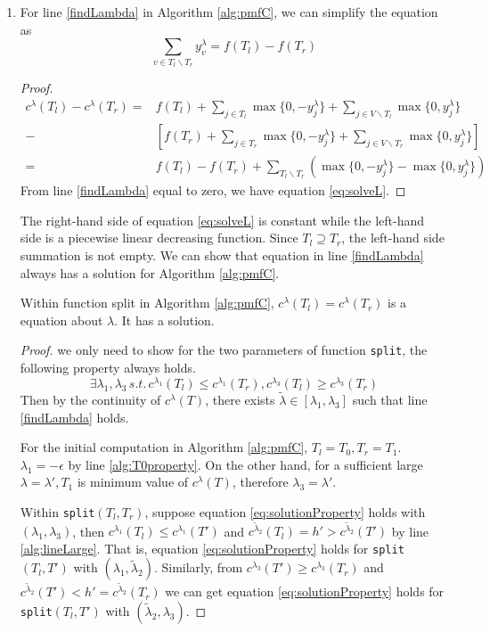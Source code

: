 \documentclass{article}
\begin{document}
\begin{enumerate}
\item For line \ref{findLambda} in  Algorithm \ref{alg:pmfC}, we can simplify the equation as
\begin{equation}\label{eq:solveL}
	\sum_{v\in T_l \backslash T_r} y^{\lambda}_v  = f(T_l)-f(T_r)
\end{equation}
\begin{proof}
	\begin{align*}
	c^{\lambda}(T_l) -
	c^{\lambda}(T_r)  =& f(T_l) + \sum_{j \in T_l} \max\{0, -y^{\lambda}_j\} + \sum_{j \in V\backslash T_l} \max\{0, y^{\lambda}_j\} \\
	-& [f(T_r) + \sum_{j \in T_r} \max\{0, -y^{\lambda}_j\} + \sum_{j \in V\backslash T_r} \max\{0, y^{\lambda}_j\}] \\
	= & f(T_l) - f(T_r) + \sum_{T_l \backslash T_r} (\max\{0, -y^{\lambda}_j\} - \max\{0, y^{\lambda}_j\} )
	\end{align*}
	From line \ref{findLambda} equal to zero, we have equation \eqref{eq:solveL}.
\end{proof}
The right-hand side of equation \eqref{eq:solveL} is constant while the left-hand side is a piecewise linear decreasing function. Since $T_l \supseteq T_r$, the left-hand side summation is not empty. We can show that equation in line \ref{findLambda} always has a solution for Algorithm \ref{alg:pmfC}.
\begin{lemma}
	Within function \textrm{split} in Algorithm \ref{alg:pmfC}, $c^{\lambda}(T_l) = c^{\lambda}(T_r)$ is a equation about $\lambda$. It has a solution.
\end{lemma}
\begin{proof}
	we only need to show for the two parameters of function \texttt{split}, the following property always holds.
\begin{equation}\label{eq:solutionProperty}
\exists \lambda_1, \lambda_3 \,s.t.\, c^{\lambda_1}(T_l) \leq c^{\lambda_1}(T_r), c^{\lambda_3}(T_l) \geq c^{\lambda_3}(T_r)
\end{equation}
Then by the continuity of $c^{\lambda}(T)$, there exists $\tilde{\lambda} \in [\lambda_1, \lambda_3]$ such that line \eqref{findLambda} holds.

For the initial computation in Algorithm \ref{alg:pmfC},
	$T_l = T_0, T_r = T_1$. $\lambda_1 = -\epsilon$ by line \ref{alg:T0property}. On the other hand, for a sufficient large $\lambda=\lambda', T_1$ is minimum value of $c^{\lambda}(T)$, therefore $\lambda_3 = \lambda'$. 

Within \texttt{split}$(T_l, T_r)$, suppose equation \eqref{eq:solutionProperty} holds with $(\lambda_1, \lambda_3)$, then 
$c^{\lambda_1}(T_l) \leq c^{\lambda_1}(T')$ and $c^{\tilde{\lambda}_2}(T_l) = h' > c^{\tilde{\lambda}_2}(T')$ by line \ref{alg:lineLarge}. That is, equation \eqref{eq:solutionProperty} holds for \texttt{split}$(T_l, T')$ with $(\lambda_1, \tilde{\lambda}_2)$. Similarly, from $c^{\lambda_3}(T') \geq c^{\lambda_3}(T_r)$ and $c^{\tilde{\lambda}_2}(T') < h' = c^{\tilde{\lambda}_2}(T_r)$ we can get  equation \eqref{eq:solutionProperty} holds for \texttt{split}$(T_l, T')$ with $(\tilde{\lambda}_2, \lambda_3)$.


\end{proof}
\end{enumerate}
\end{document}
